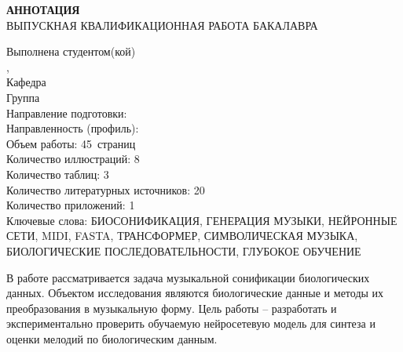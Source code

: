 \documentclass[a4paper, 12pt]{extreport}
\begin{document}


\pagestyle{empty}

\newcommand{\annotationpages}{45}
\newcommand{\annotationfigures}{8}
\newcommand{\annotationtables}{3}
\newcommand{\annotationreferences}{20}
\newcommand{\annotationappendices}{1}

\begin{par}
\setlength{\baselineskip}{5mm}

\begin{center}
    \textbf{АННОТАЦИЯ} \\
    \vspace{5mm}
    ВЫПУСКНАЯ КВАЛИФИКАЦИОННАЯ РАБОТА БАКАЛАВРА \\
    \noindent
\end{center}

\begin{flushleft}
    Выполнена студентом(кой) \uline{\studentforabstract\hfill} \\
    \faculty, \university \\
    Кафедра \uline{\department\hfill} \\
    Группа \uline{\group} \\
    Направление подготовки: \programnum\thinspace\programname \\
    Направленность (профиль): \specialization \\
    \vspace{5mm}
    Объем работы: \annotationpages\ страниц \\
    Количество иллюстраций: \annotationfigures \\
    Количество таблиц: \annotationtables \\
    Количество литературных источников: \annotationreferences \\
    Количество приложений: \annotationappendices \\
    Ключевые слова: БИОСОНИФИКАЦИЯ, ГЕНЕРАЦИЯ МУЗЫКИ, НЕЙРОННЫЕ СЕТИ, MIDI, FASTA, ТРАНСФОРМЕР, СИМВОЛИЧЕСКАЯ МУЗЫКА, БИОЛОГИЧЕСКИЕ ПОСЛЕДОВАТЕЛЬНОСТИ, ГЛУБОКОЕ ОБУЧЕНИЕ
\end{flushleft}

В работе рассматривается задача музыкальной сонификации биологических данных. Объектом исследования являются биологические данные и методы их преобразования в музыкальную форму. Цель работы -- разработать и экспериментально проверить обучаемую нейросетевую модель для синтеза и оценки мелодий по биологическим данным.


\end{par}
\end{document}
